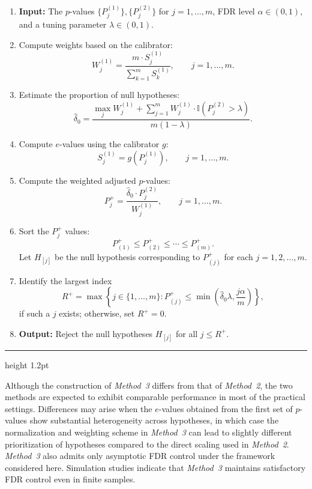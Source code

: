\documentclass[11pt]{article}
\numberwithin{equation}{section}
\theoremstyle{plain}
\theoremstyle{remark}
\begin{document}
\begin{enumerate}
\item \textbf{Input:} The $p$-values $\{P_j^{(1)}\}, \{P_j^{(2)}\}$ for $j = 1, \dots, m$, FDR level $\alpha \in (0, 1)$, and a tuning parameter $\lambda \in (0, 1)$.

\item Compute weights based on the calibrator:
\[
W_j^{(1)} = \frac{m \cdot S_j^{(1)}}{\sum_{k=1}^m S_k^{(1)}},
\qquad j = 1, \dots, m.
\]

\item Estimate the proportion of null hypotheses:
\[
\hat{\delta}_0
= \frac{\max_j W_j^{(1)} + \sum_{j=1}^m W_j^{(1)} \cdot \mathbb{I}\!\left(P_j^{(2)} > \lambda\right)}{m(1 - \lambda)}.
\]

\item Compute $e$-values using the calibrator $g$:
\[
S_j^{(1)} = g\!\left(P_j^{(1)}\right), \qquad j = 1, \dots, m.
\]

\item Compute the weighted adjusted $p$-values:
\[
P_j^+
= \frac{\hat{\delta}_0 \cdot P_j^{(2)}}{W_j^{(1)}},
\qquad j = 1, \dots, m.
\]

\item Sort the $P_j^+$ values:
\[
P_{(1)}^+ \leq P_{(2)}^+ \leq \cdots \leq P_{(m)}^+.
\]
Let $H_{[j]}$ be the null hypothesis corresponding to $P_{(j)}^+$ for each $j = 1,2,\dots,m$.

\item Identify the largest index
\[
R^+
= \max \left\{ j \in \{1, \dots, m\} :
P_{(j)}^+ \leq \min\!\left( \hat{\delta}_0 \lambda, \frac{j\alpha}{m} \right) \right\},
\]
if such a $j$ exists; otherwise, set $R^+ = 0$.

\item \textbf{Output:} Reject the null hypotheses $H_{[j]}$ for all $j \leq R^+$.
\end{enumerate}

\vspace{0.4em}
\hrule height 1.2pt
\vspace{0.5em}

Although the construction of \textit{Method~3} differs from that of \textit{Method~2}, the two methods are expected to exhibit comparable performance in most of the practical settings. Differences may arise when the $e$-values obtained from the first set of $p$-values show substantial heterogeneity across hypotheses, in which case the normalization and weighting scheme in \textit{Method~3} can lead to slightly different prioritization of hypotheses compared to the direct scaling used in \textit{Method~2}. \textit{Method~3} also admits only asymptotic FDR control under the framework considered here. Simulation studies indicate that \textit{Method~3} maintains satisfactory FDR control even in finite samples.
\end{document}
